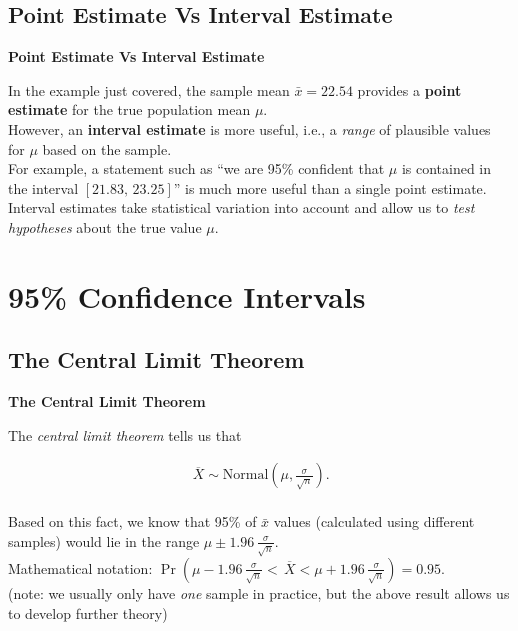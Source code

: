 \documentclass[compress]{beamer}        %
\makeatletter
\newcommand{\tcb}{\textcolor{beamer@blendedblue}}
\makeatother
\begin{document}
\subsection{Point Estimate Vs Interval Estimate}
\begin{frame}{\bf \tcb{Point Estimate Vs Interval Estimate}}

In the example just covered, the sample mean $\bar x = 22.54$ provides a {\bf point estimate} for the true population mean $\mu$.\\[0.6cm]

However, an {\bf interval estimate} is more useful, i.e., a \emph{range} of plausible values for $\mu$ based on the sample.\\[0.6cm]

For example, a statement such as ``we are 95\% confident that $\mu$ is contained in the interval $[21.83,\,23.25]$'' is much more useful than a single point estimate.\\[0.6cm]

Interval estimates take statistical variation into account and allow us to \emph{test hypotheses} about the true value $\mu$.

\end{frame}



\section{95\% Confidence Intervals}
\subsection{The Central Limit Theorem}
\begin{frame}{\bf \tcb{The Central Limit Theorem}}

The \emph{central limit theorem} tells us that

\begin{align*}
\,\overline{\!X} \sim \text{Normal}\left(\mu, \frac{\sigma}{\sqrt{n}}\right).\\
\end{align*}

Based on this fact, we know that 95\% of $\bar x$ values (calculated using different samples) would lie in the range $\mu \pm 1.96\,\frac{\sigma}{\sqrt{n}}$.\\[0.8cm]

Mathematical notation: $\Pr\left(\mu-1.96\,\frac{\sigma}{\sqrt{n}} < \,\overline{\!X} < \mu+1.96\,\frac{\sigma}{\sqrt{n}}\right) = 0.95$.\\[0.8cm]

{\footnotesize(note: we usually only have \emph{one} sample in practice, but the above result allows us to develop further theory)}

\end{frame}
\end{document}
